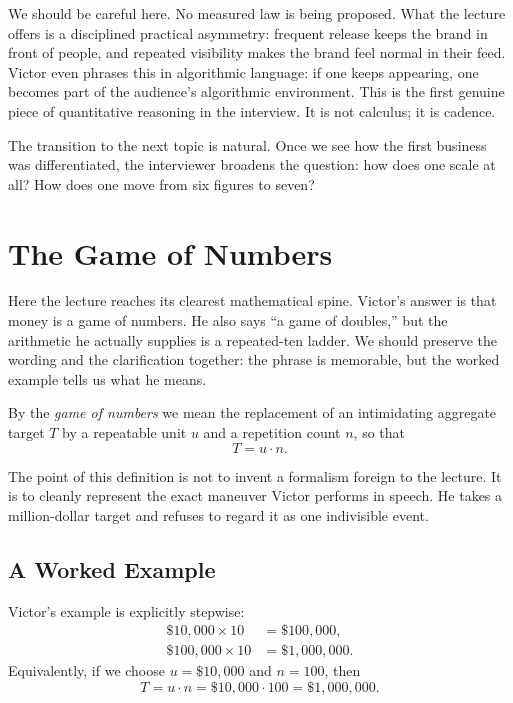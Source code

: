 We should be careful here. No measured law is being proposed. What the lecture offers is a disciplined practical asymmetry: frequent release keeps the brand in front of people, and repeated visibility makes the brand feel normal in their feed. Victor even phrases this in algorithmic language: if one keeps appearing, one becomes part of the audience's algorithmic environment. This is the first genuine piece of quantitative reasoning in the interview. It is not calculus; it is cadence.

The transition to the next topic is natural. Once we see how the first business was differentiated, the interviewer broadens the question: how does one scale at all? How does one move from six figures to seven?

\section{The Game of Numbers}

Here the lecture reaches its clearest mathematical spine. Victor's answer is that money is a game of numbers. He also says ``a game of doubles,'' but the arithmetic he actually supplies is a repeated-ten ladder. We should preserve the wording and the clarification together: the phrase is memorable, but the worked example tells us what he means.

\begin{definition}
By the \emph{game of numbers} we mean the replacement of an intimidating aggregate target \(T\) by a repeatable unit \(u\) and a repetition count \(n\), so that
\begin{equation}
T = u \cdot n.
\end{equation}
\end{definition}

The point of this definition is not to invent a formalism foreign to the lecture. It is to cleanly represent the exact maneuver Victor performs in speech. He takes a million-dollar target and refuses to regard it as one indivisible event.

\subsection{A Worked Example}

Victor's example is explicitly stepwise:
\begin{align}
\$10{,}000 \times 10 &= \$100{,}000, \\
\$100{,}000 \times 10 &= \$1{,}000{,}000.
\end{align}
Equivalently, if we choose \(u = \$10{,}000\) and \(n = 100\), then
\begin{equation}
T = u \cdot n = \$10{,}000 \cdot 100 = \$1{,}000{,}000.
\end{equation}

